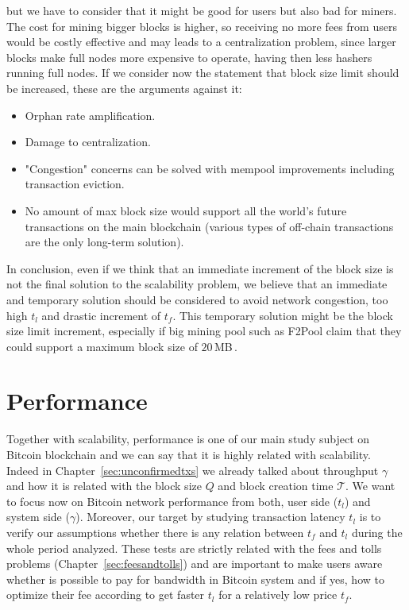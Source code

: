 \documentclass[USenglish]{uit-thesis}
\begin{document}
but we have to consider that it might be good
for users but also bad for miners.
The cost for mining bigger blocks is higher, so receiving
no more fees from users would be costly effective
and may leads to a centralization problem, since
larger blocks make full nodes more expensive to
operate, having then less hashers running full nodes.
If we consider now the statement that block size
limit should be increased, these are the
arguments against it:
\begin{itemize}
	\item Orphan rate amplification.
	\item Damage to centralization.
	\item "Congestion" concerns can be solved with mempool improvements including transaction eviction.
	\item No amount of max block size would support all the world's future transactions on the main blockchain (various types of off-chain transactions are the only long-term solution).
\end{itemize}
In conclusion, even if we think that an immediate increment of the block size
is not the final solution to the scalability problem, we believe that
an immediate and temporary solution should be considered to
avoid network congestion, too high $t_l$ and drastic increment of $t_f$.
This temporary solution
might be the block size limit increment, especially if
big mining pool such as F2Pool claim that they could support
a maximum block size of $20$\,MB\,\cite{blocksizecontroversy}.

\section{Performance}
\label{sec:performance}
Together with scalability, performance is one of our
main study subject on Bitcoin blockchain and we can
say that it is highly related with scalability. Indeed in
Chapter~\ref{sec:unconfirmedtxs} we already
talked about throughput $\gamma$ and how it is
related with the block size $Q$ and block creation time
$\mathcal{T}$. We want to focus now on Bitcoin network
performance from both, user side ($t_l$)
and system side ($\gamma$). Moreover,
our target by studying
transaction latency $t_l$ is to verify our assumptions
whether there is any relation between $t_f$ and $t_l$
during the whole period analyzed. These tests are
strictly related with the fees and tolls problems
(Chapter~\ref{sec:feesandtolls}) and are important
to make users aware whether is possible
to pay for bandwidth in Bitcoin system and
if yes, how to optimize their fee according to get
faster $t_l$ for a relatively low price $t_f$.
\end{document}
